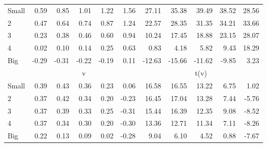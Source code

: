 \begin{table}[!ht]
\begin{tabular}{lrrrrrrrrrr}
    \\
      \cmidrule(r){2-6} \cmidrule(r){7-11}

    Small   & 0.59  & 0.85  & 1.01  & 1.22  & 1.56  & 27.11  & 35.38  & 39.49  & 38.52  & 28.56  \\
         2  & 0.47  & 0.64  & 0.74  & 0.87  & 1.24  & 22.57  & 28.35  & 31.35  & 34.21  & 33.66  \\
         3  & 0.23  & 0.38  & 0.46  & 0.60  & 0.94  & 10.24  & 17.45  & 18.88  & 23.15  & 28.07  \\
         4  & 0.02  & 0.10  & 0.14  & 0.25  & 0.63  & 0.83  & 4.18  & 5.82  & 9.43  & 18.29  \\
    Big     & -0.29  & -0.31  & -0.22  & -0.19  & 0.11  & -12.63  & -15.66  & -11.62  & -9.85  & 3.23  \\

  
    
      & \multicolumn{5}{c}{v} & \multicolumn{5}{c}{t(v)}
    
    \\
      \cmidrule(r){2-6} \cmidrule(r){7-11}

    Small   & 0.39  & 0.43  & 0.36  & 0.23  & 0.06  & 16.58  & 16.55  & 13.22  & 6.75  & 1.02  \\
         2  & 0.37  & 0.42  & 0.34  & 0.20  & -0.23  & 16.45  & 17.04  & 13.28  & 7.44  & -5.76  \\
         3  & 0.37  & 0.39  & 0.33  & 0.25  & -0.31  & 15.44  & 16.39  & 12.35  & 9.08  & -8.52  \\
         4  & 0.37  & 0.34  & 0.30  & 0.20  & -0.30  & 13.36  & 12.71  & 11.34  & 7.11  & -8.26  \\
    Big     & 0.22  & 0.13  & 0.09  & 0.02  & -0.28  & 9.04  & 6.10  & 4.52  & 0.88  & -7.67  \\

  

  \bottomrule
\end{tabular}
\label{tbl:25_Size_Var_FF1993}
\end{table}